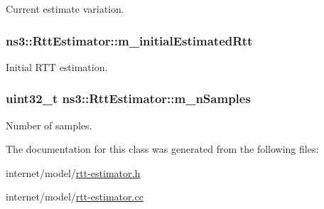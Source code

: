 Current estimate variation. 

\subsubsection[{\texorpdfstring{m\+\_\+initial\+Estimated\+Rtt}{m_initialEstimatedRtt}}]{ ns3\+::\+Rtt\+Estimator\+::m\+\_\+initial\+Estimated\+Rtt\hspace{0.3cm}{\ttfamily [private]}}\hypertarget{classns3_1_1RttEstimator_a2885f370c9d2ca8ec352de341c065497}{}\label{classns3_1_1RttEstimator_a2885f370c9d2ca8ec352de341c065497}


Initial R\+TT estimation. 

\subsubsection[{\texorpdfstring{m\+\_\+n\+Samples}{m_nSamples}}]{\setlength{\rightskip}{0pt plus 5cm}uint32\+\_\+t ns3\+::\+Rtt\+Estimator\+::m\+\_\+n\+Samples\hspace{0.3cm}{\ttfamily [protected]}}\hypertarget{classns3_1_1RttEstimator_a6a70cc48220dae4db259cb5cfee86cf5}{}\label{classns3_1_1RttEstimator_a6a70cc48220dae4db259cb5cfee86cf5}


Number of samples. 



The documentation for this class was generated from the following files\+:\begin{DoxyCompactItemize}
\item 
internet/model/\hyperlink{rtt-estimator_8h}{rtt-\/estimator.\+h}\item 
internet/model/\hyperlink{rtt-estimator_8cc}{rtt-\/estimator.\+cc}\end{DoxyCompactItemize}
